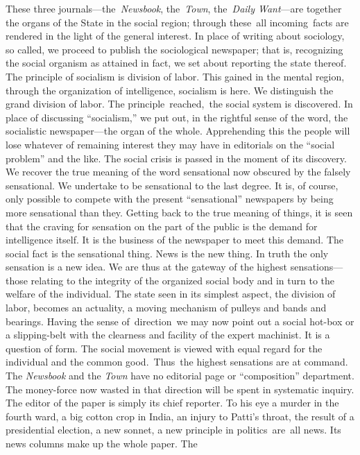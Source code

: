 \documentclass[twoside,symmetric,nobib,justified]{tufte-book}
\begin{document}
These three journals---the\emph{~Newsbook}, the~\emph{Town},
the~\emph{Daily Want}---are together the organs of the State in the
social region; through these~all incoming~facts are rendered in the
light of the general interest. In place of writing about sociology, so
called, we proceed to publish the sociological newspaper; that is,
recognizing the social organism as attained in fact, we set about
reporting the state thereof. The principle of socialism is division of
labor. This gained in the mental region, through the organization of
intelligence, socialism is here. We distinguish the grand division of
labor. The principle~reached,~the social system is discovered. In place
of discussing ``socialism,'' we put out, in the rightful sense of the
word, the socialistic newspaper---the organ of the whole. Apprehending
this the people will lose whatever of remaining interest they may have
in editorials on the ``social problem'' and the like. The social crisis
is passed in the moment of its discovery. We recover the true meaning of
the word sensational now obscured by the falsely sensational. We
undertake to be sensational to the last degree. It is, of course, only
possible to compete with the present ``sensational'' newspapers by being
more sensational than they. Getting back to the true meaning of things,
it is seen that the craving for sensation on the part of the public is
the demand for intelligence itself. It is the business of the newspaper
to meet this demand. The social fact is the sensational thing. News is
the new thing. In truth the only sensation is a new idea. We are thus at
the gateway of the highest sensations---those relating to the integrity
of the organized social body and in turn to the welfare of the
individual. The state seen in its simplest aspect, the division of
labor, becomes an actuality, a moving mechanism of pulleys and bands and
bearings. Having the sense of~direction~we may now point out a social
hot-box or a slipping-belt with the clearness and facility of the expert
machinist. It is a question of form. The social movement is viewed with
equal regard for the individual and the common good.~Thus~the highest
sensations are at command. The \emph{Newsbook} and the \emph{Town} have
no editorial page or ``composition'' department. The money-force now
wasted in that direction will be spent in systematic inquiry. The editor
of the paper is simply its chief reporter. To his eye a murder in the
fourth ward, a big cotton crop in India, an injury to Patti's throat,
the result of a presidential election, a new sonnet, a new principle in
politics~are~all news. Its news columns make up the whole paper. The
\end{document}
